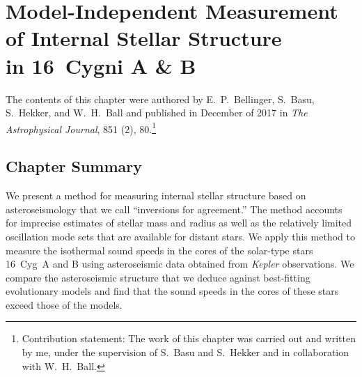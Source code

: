 \iffalse
\begin{savequote}[0.5\textwidth]
``At first sight it would seem that the deep interior of the sun and stars is less accessible to scientific investigation than any other region of the universe. Our telescopes may probe farther and farther into the depths of space; but how can we ever obtain certain knowledge of that which is hidden behind substantial barriers? What appliance can pierce through the outer layers of a star and test the conditions within?''
\qauthor{Sir Arthur Stanley Eddington\\
\emph{The Internal Constitution of Stars} (1926)}
\end{savequote}
\fi
%
\chapter{Model-Independent Measurement of Internal Stellar Structure \\in 16~Cygni A \& B}
\label{chap:inversion}

\vspace{2cm}
The contents of this chapter were authored by E.~P.~Bellinger, S.~Basu, S.~Hekker, and W.~H.~Ball and published in December of 2017 in \emph{The Astrophysical Journal}, 851 (2), 80.\footnote{Contribution statement: The work of this chapter was carried out and written by me, under the supervision of S.~Basu and S.~Hekker and in collaboration with W.~H.~Ball. } 
\nocite{2017ApJ...851...80B}

\vspace*{1cm}

\section*{Chapter Summary}
We present a method for measuring internal stellar structure based on asteroseismology that we call ``inversions for agreement.'' 
The method accounts for imprecise estimates of stellar mass and radius as well as the relatively limited oscillation mode sets that are available for distant stars. 
We apply this method to measure the isothermal sound speeds in the cores of the solar-type stars 16~Cyg~A and B using asteroseismic data obtained from \emph{Kepler} observations. 
We compare the asteroseismic structure that we deduce against best-fitting evolutionary models and find that the sound speeds in the cores of these stars exceed those of the models. 
\newpage
%
%
%
%

